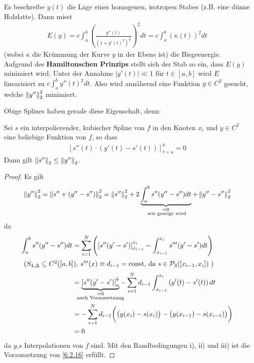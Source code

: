 Es beschreibe $y(t)$ die Lage eines
homogenen, isotropen Stabes (z.B. eine dünne Holzlatte).
Dann misst
\begin{gather*}
  E(y) = c \int_a^b\left(
    \frac{y''(t)}{(1+y'(t)^2)^{\frac{3}{2}}}
  \right)^2dt
  = c \int_a^b\left(
    \kappa(t)
  \right)^2dt
\end{gather*}
(wobei $\kappa $ die Krümmung der Kurve $y$ in der Ebene ist) 
die Biegeenergie.
Aufgrund des \textbf{Hamiltonschen Prinzips}
stellt sich der Stab so ein, dass $E(y)$ minimiert wird.
Unter der Annahme $|y'(t)| \ll 1$ für $t\in [a,b]$ 
wird $E$ linearisiert zu $c\int_a^by''(t)^2dt$.
Also wird annähernd eine Funktion $y\in C^2$ gesucht,
welche $\nn[y'']_2^2$ minimiert.

Obige Splines haben gerade diese Eigenschaft, denn:

\begin{Satze}\label{6.2.16}
  Sei $s$ ein interpolierender, kubischer Spline von $f$
  in den Knoten $x_i $ und $y\in C^2$ eine beliebige Funktion
  von $f$, so dass 
  \begin{gather*}
    \left[s''(t)\cdot(y'(t)-s'(t))\right]_{t=a}^{b}=0
  \end{gather*}
  Dann gilt $\nn[s'']_2 \leq \nn[y'']_2$.

  \begin{proof}
    Es gilt
    \begin{gather*}
      \nn[y'']_2^2 = \nn[s''+(y''-s'')]_2^2
      = \nn[s'']_2^2
      + 2\underbrace{\int_{a}^{b}s''(y''-s'')dt}_{
        \mathclap{\substack{=0 \\ \text{ wie gezeigt wird}}}
      }
      + \nn[y''-s'']_2^2
    \end{gather*}
    da
    \begin{align*}
      \int_{a}^{b} s''(y''-s'')dt 
      &= \sum_{i=1}^{N}\left(\left[
        s''(y'-s')\right]_{x_{i-1}}^{x_i}
        -\int_{x_{i-1}}^{x_i}s'''(y'-s')dt\right)\\
      \intertext{
      ($S_{4,\Delta}\subseteq C^2([a,b])$, 
      $s'''(x)\equiv d_{i-1}=\Const$, 
      da $s\in\p_3([x_{i-1},x_i])$ )
      }
      &= \underbrace{\left[ s''(y'-s')\right]_{a}^{b}}_{
        \mathclap{\substack{ =0 \\ \text{ nach Voraussetzung } }}
      }
      - \sum_{i=1}^{N} d_{i-1}
      \int_{x_{i-1}}^{x_i} \left(y'(t)-s'(t)\right) dt\\
      &=-\sum_{i=1}^N d_{i-1}\bigg(\big(y(x_i)-s(x_i)\big)
        - \big(y(x_{i-1})-s(x_{i-1})\big)\bigg) \\
      &=0
    \end{align*}
    da $y$,$s$ Interpolationen von $f$ sind.
    Mit den Randbedingungen i), ii) und iii) 
    ist die Voraussetzung von \ref{6.2.16} erfüllt.
  \end{proof}
\end{Satze}

